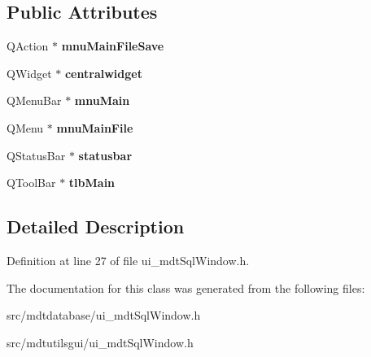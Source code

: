 \subsection*{Public Attributes}
\begin{DoxyCompactItemize}
\item 
\hypertarget{class_ui__mdt_sql_window_a58e6265c1ff8e257f024cd3dd1bf5e89}{
QAction $\ast$ {\bfseries mnuMainFileSave}}
\label{class_ui__mdt_sql_window_a58e6265c1ff8e257f024cd3dd1bf5e89}

\item 
\hypertarget{class_ui__mdt_sql_window_ad4fe69de0e25edbc0b197f0bcf62632a}{
QWidget $\ast$ {\bfseries centralwidget}}
\label{class_ui__mdt_sql_window_ad4fe69de0e25edbc0b197f0bcf62632a}

\item 
\hypertarget{class_ui__mdt_sql_window_a2cdcd27d2a4c021236a1d2adfa483cb5}{
QMenuBar $\ast$ {\bfseries mnuMain}}
\label{class_ui__mdt_sql_window_a2cdcd27d2a4c021236a1d2adfa483cb5}

\item 
\hypertarget{class_ui__mdt_sql_window_aad9106c68c6839271df273119b5b74c8}{
QMenu $\ast$ {\bfseries mnuMainFile}}
\label{class_ui__mdt_sql_window_aad9106c68c6839271df273119b5b74c8}

\item 
\hypertarget{class_ui__mdt_sql_window_a48ad415bc7aa41b4d9a7386b6318ac7d}{
QStatusBar $\ast$ {\bfseries statusbar}}
\label{class_ui__mdt_sql_window_a48ad415bc7aa41b4d9a7386b6318ac7d}

\item 
\hypertarget{class_ui__mdt_sql_window_a7c4b51eb698a2d510ad52e5f86500ec2}{
QToolBar $\ast$ {\bfseries tlbMain}}
\label{class_ui__mdt_sql_window_a7c4b51eb698a2d510ad52e5f86500ec2}

\end{DoxyCompactItemize}


\subsection{Detailed Description}


Definition at line 27 of file ui\_\-mdtSqlWindow.h.



The documentation for this class was generated from the following files:\begin{DoxyCompactItemize}
\item 
src/mdtdatabase/ui\_\-mdtSqlWindow.h\item 
src/mdtutilsgui/ui\_\-mdtSqlWindow.h\end{DoxyCompactItemize}
